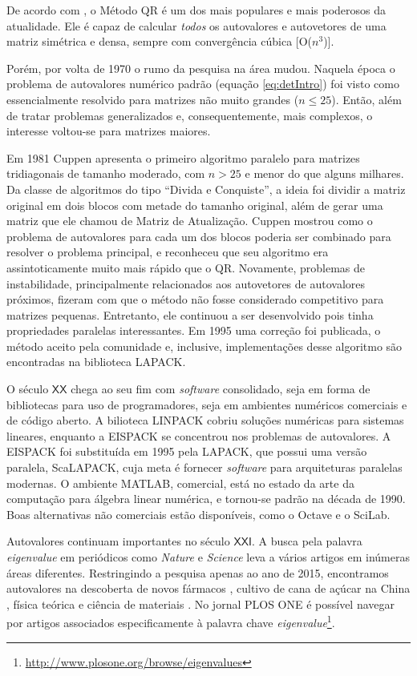 	 De acordo com \cite{autovaloresSecXX}, o Método QR é um dos mais populares e mais poderosos da atualidade. Ele é capaz de calcular \emph{todos} os autovalores e autovetores de uma matriz simétrica e densa, sempre  com convergência cúbica [O($n^3$)].
	
	Porém, por volta de 1970 o rumo da pesquisa na área mudou. Naquela época o problema de autovalores numérico padrão (equação \ref{eq:detIntro}) foi visto como essencialmente resolvido para matrizes não muito grandes ($n \leq 25$). Então, além de tratar problemas generalizados e, consequentemente, mais complexos, o interesse voltou-se para matrizes maiores.
	
	Em 1981 Cuppen apresenta o primeiro algoritmo paralelo para matrizes tridiagonais de tamanho moderado, com $n > 25$ e menor do que alguns milhares. Da classe de algoritmos do tipo ``Divida e Conquiste'', a ideia foi dividir a matriz original em dois blocos com metade do tamanho original, além de gerar uma matriz que ele chamou de Matriz de Atualização. Cuppen mostrou como o problema de autovalores para cada um dos blocos poderia ser combinado para resolver o problema principal, e reconheceu que seu algoritmo era assintoticamente muito mais rápido que o QR. Novamente, problemas de instabilidade, principalmente relacionados aos autovetores de autovalores próximos, fizeram com que o método não fosse considerado competitivo para matrizes pequenas. Entretanto, ele continuou a ser desenvolvido pois tinha propriedades paralelas interessantes. Em 1995 uma correção foi publicada, o método aceito pela comunidade e, inclusive, implementações desse algoritmo são encontradas na biblioteca LAPACK.
	
	O século $\mathsf{XX}$ chega ao seu fim com \emph{software} consolidado, seja em forma de bibliotecas para uso de programadores, seja em ambientes numéricos comerciais e de código aberto. A bilioteca LINPACK cobriu soluções numéricas para sistemas lineares, enquanto a EISPACK se concentrou nos problemas de autovalores. A EISPACK foi substituída em 1995 pela LAPACK, que possui uma versão paralela, ScaLAPACK, cuja meta é fornecer \emph{software} para arquiteturas paralelas modernas. O ambiente MATLAB, comercial, está no estado da arte da computação para álgebra linear numérica, e tornou-se padrão na década de 1990. Boas alternativas não comerciais estão disponíveis, como o Octave e o SciLab.
	
	
	Autovalores continuam importantes no século $\mathsf{XXI}$. A busca pela palavra \emph{eigenvalue} em periódicos como \emph{Nature} e \emph{Science} leva a vários artigos em inúmeras áreas diferentes. Restringindo a pesquisa apenas ao ano de 2015, encontramos autovalores na descoberta de novos fármacos \cite{avMedicamento2015}, cultivo de cana de açúcar na China \cite{avCana2015}, física teórica \cite{avFisTeo2015} e ciência de materiais \cite{avCienciaMateriais2015}. No jornal PLOS ONE é possível navegar por artigos associados especificamente à palavra chave \emph{eigenvalue}\footnote{\href{http://www.plosone.org/browse/eigenvalues}{http://www.plosone.org/browse/eigenvalues}}.
	
